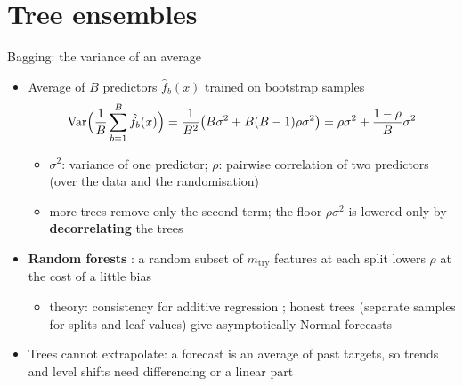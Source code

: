 \section{Tree ensembles}

\begin{frame}{Bagging: the variance of an average}
\itemsize{\small}
\begin{itemize}
    \item Average of $B$ predictors $\hat f_b(x)$ trained on bootstrap samples 
    \[ \text{Var}\Big(\frac1B\sum_{b=1}^B\hat f_b(x)\Big) = \frac1{B^2}\big(B\sigma^2 + B(B - 1)\rho\sigma^2\big) = \rho\sigma^2 + \frac{1 - \rho}B\sigma^2 \]
    \begin{itemize}
        \item $\sigma^2$: variance of one predictor; $\rho$: pairwise correlation of two predictors (over the data and the randomisation)
        \item more trees remove only the second term; the floor $\rho\sigma^2$ is lowered only by \textbf{decorrelating} the trees
    \end{itemize}
    \item \textbf{Random forests} : a random subset of $m_{\mathrm{try}}$ features at each split lowers $\rho$ at the cost of a little bias
    \begin{itemize}
        \item theory: consistency for additive regression ; honest trees (separate samples for splits and leaf values) give asymptotically Normal forecasts 
    \end{itemize}
    \item Trees cannot extrapolate: a forecast is an average of past targets, so trends and level shifts need differencing or a linear part
\end{itemize}
\end{frame}


